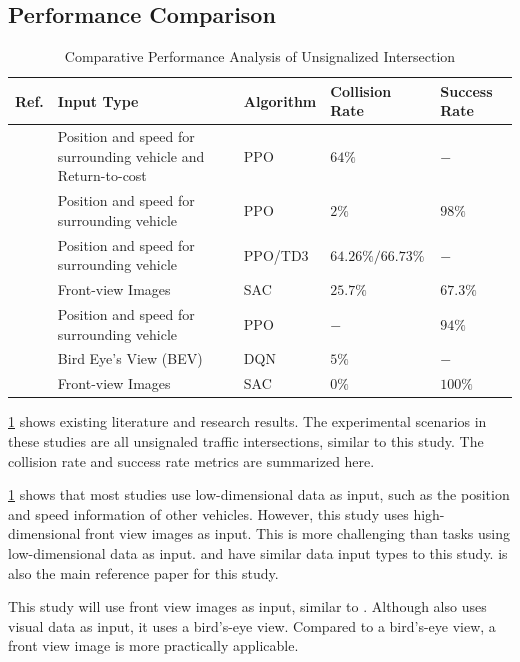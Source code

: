     \subsection{Performance Comparison}
    \begin{table}[htbp]
    \centering
    \caption{Comparative Performance Analysis of Unsignalized Intersection}
    \label{tab:comparative_performance}
    \begin{tabularx}{\linewidth}{lXlll}
    \toprule
    \textbf{Ref.} & \textbf{Input Type} & \textbf{Algorithm} & \textbf{Collision Rate} & \textbf{Success Rate}\\
    \midrule
    \cite{r_zhao_autonomous_2025} & Position and speed for surrounding vehicle and Return-to-cost & PPO & $64\%$ & $-$ \\
    \addlinespace
    \cite{doroudian_balancing_2024} & Position and speed for surrounding vehicle & PPO & $2\%$ & $98\%$ \\
    \addlinespace
    \cite{zhao_constraint-guided_2024} & Position and speed for surrounding vehicle & PPO/TD3 & $64.26\% / 66.73\%$ & $-$ \\
    \addlinespace
    \cite{x_zhang_integrating_2025} & Front-view Images & SAC & $25.7\%$ & $67.3\%$ \\
    \addlinespace
    \cite{liu_mtd-gpt_2023} & Position and speed for surrounding vehicle & PPO & $-$ & $94\%$ \\
    \addlinespace
    \cite{kargar_vision_2022} & Bird Eye’s View (BEV) & DQN & $5\%$ & $-$ \\
    \addlinespace
    \cite{elallid_improving_2024} & Front-view Images & SAC & $0\%$ & $100\%$ \\
    \bottomrule
    \end{tabularx}
    \end{table}

    \ref{tab:comparative_performance} shows existing literature and research results. The experimental scenarios in these studies are all unsignaled traffic intersections, similar to this study. The collision rate and success rate metrics are summarized here.

    \ref{tab:comparative_performance} shows that most studies use low-dimensional data as input, such as the position and speed information of other vehicles. However, this study uses high-dimensional front view images as input. This is more challenging than tasks using low-dimensional data as input. \cite{elallid_improving_2024} and \cite{kargar_vision_2022} have similar data input types to this study. \cite{elallid_improving_2024} is also the main reference paper for this study.

    This study will use front view images as input, similar to \cite{elallid_improving_2024}. Although \cite{kargar_vision_2022} also uses visual data as input, it uses a bird's-eye view. Compared to a bird's-eye view, a front view image is more practically applicable.
    
\newpage